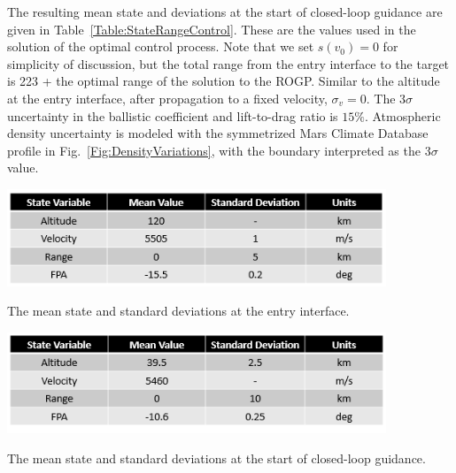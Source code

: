 The resulting mean state and deviations at the start of closed-loop guidance are given in Table~\ref{Table:StateRangeControl}. These are the values used in the solution of the optimal control process. Note that we set $s(v_0) = 0$ for simplicity of discussion, but the total range from the entry interface to the target is 223 + the optimal range of the solution to the ROGP. 
Similar to the altitude at the entry interface, after propagation to a fixed velocity, $\sigma_v = 0$. The 3$\sigma$ uncertainty in the ballistic coefficient and lift-to-drag ratio is $15\%$. Atmospheric density uncertainty is modeled with the symmetrized Mars Climate Database profile in Fig.~\ref{Fig:DensityVariations}, with the boundary interpreted as the 3$\sigma$ value.
\begin{table}[h!]
	\centering
	\includegraphics[width=0.85\textwidth]{Images/EntryInterfaceState}
	\caption{The mean state and standard deviations at the entry interface.}
	\label{Table:StateEntryInterface}
\end{table}
\begin{table}[h!]
	\centering
	\includegraphics[width=0.85\textwidth]{Images/OptimizationState}
	\caption{The mean state and standard deviations at the start of closed-loop guidance.}
	\label{Table:StateRangeControl}
\end{table}

